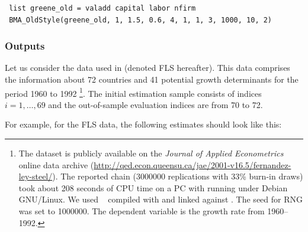 \begin{lstlisting}
 list greene_old = valadd capital labor nfirm
 BMA_OldStyle(greene_old, 1, 1.5, 0.6, 4, 1, 1, 3, 1000, 10, 2)
\end{lstlisting}

\subsubsection{Outputs}\label{sec:outputs}
Let us consider the data used in \cite{FernandezLeySteel2001b}
(denoted FLS hereafter). This data comprises the information about 72
countries and 41 potential growth determinants for the period 1960 to
1992%
\footnote{The dataset is publicly available on the \emph{Journal of
	Applied Econometrics} online data archive
	(\url{http://qed.econ.queensu.ca/jae/2001-v16.5/fernandez-ley-steel/}).
	The reported chain (3000000 replications with 33\% burn-in draws)
	took about 208 seconds of CPU time on a PC with {\machine} running
	under Debian GNU/Linux. We used
	~{\gretlver} compiled with {\compiler} and linked against \blas.
	The seed for RNG was set to 1000000. The dependent variable is
	the growth rate from 1960--1992.}.
The initial estimation sample consists of indices $i=1,\ldots,69$ and
the out-of-sample evaluation indices are from 70 to 72.

For example, for the FLS data, the following estimates should
look like this:


